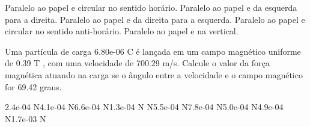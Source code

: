 \documentclass[12pt, addpoints]{exam}
\begin{document}
\begin{questions}
\begin{multicols*}{2}
\begin{choices}
\choice Paralelo ao papel e circular no sentido horário. 
\choice Paralelo ao papel e da esquerda para a direita. 
\choice Paralelo ao papel e da direita para a esquerda. 
\choice Paralelo ao papel e circular no sentido anti-horário. 
\choice Paralelo ao papel e na vertical. 
\end{choices}
\question Uma partícula de carga 6.80e-06 C é lançada em um campo magnético uniforme de    0.39 T , com uma velocidade de 700.29 m/s. Calcule o valor da força magnética atuando na carga se o ângulo entre a velocidade e o campo magnético for   69.42 graus.

\begin{oneparchoices}
\choice 2.4e-04 N\choice 4.1e-04 N\choice 6.6e-04 N\choice 1.3e-04 N N\choice 5.5e-04 N\choice 7.8e-04 N\choice 5.0e-04 N\choice 4.9e-04 N\choice 1.7e-03 N
\end{oneparchoices}\end{multicols*}
\end{questions}
\newpage
\end{document}
